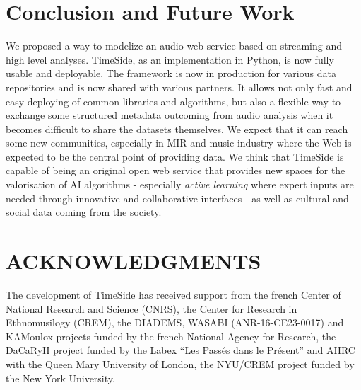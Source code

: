 \documentclass{article}
\begin{document}
\section{Conclusion and Future Work}

We proposed a way to modelize an audio web service based on streaming and high level analyses. TimeSide, as an implementation in Python, is now fully usable and deployable. The framework is now in production for various data repositories and is now shared with various partners. It allows not only fast and easy deploying of common libraries and algorithms, but also a flexible way to exchange some structured metadata outcoming from audio analysis when it becomes difficult to share the datasets themselves. We expect that it can reach some new communities, especially in MIR and music industry where the Web is expected to be the central point of providing data. We think that TimeSide is capable of being an original open web service that provides new spaces for the valorisation of AI algorithms - especially \textit{active learning} where expert inputs are needed through innovative and collaborative interfaces - as well as cultural and social data coming from the society.

\section{ACKNOWLEDGMENTS}

The development of TimeSide has received support from the french Center of National Research and Science (CNRS), the Center for Research in Ethnomusilogy (CREM), the DIADEMS, WASABI (ANR-16-CE23-0017) and KAMoulox projects funded by the french National Agency for Research, the DaCaRyH project funded by the Labex ``Les Pass\'es dans le Pr\'esent'' and AHRC with the Queen Mary University of London, the NYU/CREM project funded by the New York University.



\end{document}
